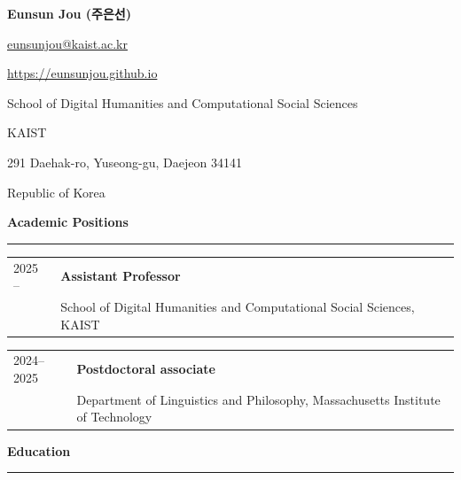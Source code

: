 \documentclass[10pt]{article}
\newcommand{\sect}[1]{\vspace{5mm} {\fontsize{14}{21}\selectfont \textbf{#1}} {\vspace{0.1cm}} \hrule {\vspace{0.3cm}}}
\begin{document}
\begin{center}
{\Large \textbf{Eunsun Jou ({\batangfont 주은선})}}
\end{center}

\thispagestyle{firstpage}


\begin{minipage}[t]{0.39\textwidth}
\begin{flushleft}
\href{mailto:eunsunjou@kaist.ac.kr}{eunsunjou@kaist.ac.kr}

\href{https://eunsunjou.github.io}{https://eunsunjou.github.io}
\end{flushleft}
\end{minipage}
\begin{minipage}[t]{0.6\textwidth}
\begin{flushright}
School of Digital Humanities and Computational Social Sciences

KAIST

291 Daehak-ro, Yuseong-gu, Daejeon 34141

Republic of Korea

\end{flushright}
\end{minipage}




\sect{Academic Positions}

\begin{tabular}{@{}p{}p{}}
{2025 --}&{\textbf{Assistant Professor}}\\
{}&{School of Digital Humanities and Computational Social Sciences, KAIST}\\
\end{tabular}

\vspace{2mm}

\begin{tabular}{@{}p{}p{}} %
{2024--2025}&{\textbf{Postdoctoral associate}}\\
{}&{Department of Linguistics and Philosophy, Massachusetts Institute of Technology}\\
\end{tabular}

\sect{Education}
\end{document}
